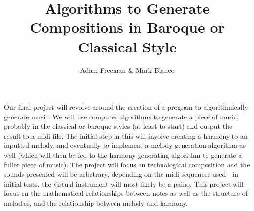 \documentclass [12pt]{article}
\begin{document}
\title {Algorithms to Generate Compositions in Baroque or Classical Style}
\author {Adam Freeman & Mark Blanco}
\maketitle

Our final project will revolve around the creation of a program to
algorithmically generate music. We will use computer algorithms to
generate a piece of music, probably in the classical or baroque styles
(at least to start) and output the result to a midi file.  The initial
step in this will involve creating a harmony to an inputted melody, and
eventually to implement a melody generation algorithm as well (which
will then be fed to the harmony generating algorithm to generate a
fuller piece of music).  The project will focus on technological
composition and the sounds presented will be arbatrary, depending on
the midi sequencer used -  in initial tests, the virtual instrument
will most likely be a paino.  This project will focus on the
mathematical relationships between notes as well as the structure of
melodies, and the relationship between melody and harmony.
\end{document}
